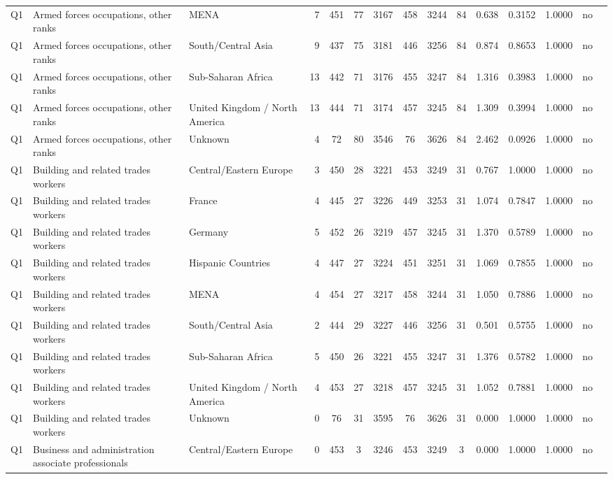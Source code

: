 \begin{longtable}{lllrcccccccccll}
Q1 & Armed forces occupations, other ranks & MENA & 7 & 451 & 77 & 3167 & 458 & 3244 & 84 & 0.638 & 0.3152 & 1.0000 & no \\
Q1 & Armed forces occupations, other ranks & South/Central Asia & 9 & 437 & 75 & 3181 & 446 & 3256 & 84 & 0.874 & 0.8653 & 1.0000 & no \\
Q1 & Armed forces occupations, other ranks & Sub-Saharan Africa & 13 & 442 & 71 & 3176 & 455 & 3247 & 84 & 1.316 & 0.3983 & 1.0000 & no \\
Q1 & Armed forces occupations, other ranks & United Kingdom / North America & 13 & 444 & 71 & 3174 & 457 & 3245 & 84 & 1.309 & 0.3994 & 1.0000 & no \\
Q1 & Armed forces occupations, other ranks & Unknown & 4 & 72 & 80 & 3546 & 76 & 3626 & 84 & 2.462 & 0.0926 & 1.0000 & no \\
Q1 & Building and related trades workers & Central/Eastern Europe & 3 & 450 & 28 & 3221 & 453 & 3249 & 31 & 0.767 & 1.0000 & 1.0000 & no \\
Q1 & Building and related trades workers & France & 4 & 445 & 27 & 3226 & 449 & 3253 & 31 & 1.074 & 0.7847 & 1.0000 & no \\
Q1 & Building and related trades workers & Germany & 5 & 452 & 26 & 3219 & 457 & 3245 & 31 & 1.370 & 0.5789 & 1.0000 & no \\
Q1 & Building and related trades workers & Hispanic Countries & 4 & 447 & 27 & 3224 & 451 & 3251 & 31 & 1.069 & 0.7855 & 1.0000 & no \\
Q1 & Building and related trades workers & MENA & 4 & 454 & 27 & 3217 & 458 & 3244 & 31 & 1.050 & 0.7886 & 1.0000 & no \\
Q1 & Building and related trades workers & South/Central Asia & 2 & 444 & 29 & 3227 & 446 & 3256 & 31 & 0.501 & 0.5755 & 1.0000 & no \\
Q1 & Building and related trades workers & Sub-Saharan Africa & 5 & 450 & 26 & 3221 & 455 & 3247 & 31 & 1.376 & 0.5782 & 1.0000 & no \\
Q1 & Building and related trades workers & United Kingdom / North America & 4 & 453 & 27 & 3218 & 457 & 3245 & 31 & 1.052 & 0.7881 & 1.0000 & no \\
Q1 & Building and related trades workers & Unknown & 0 & 76 & 31 & 3595 & 76 & 3626 & 31 & 0.000 & 1.0000 & 1.0000 & no \\
Q1 & Business and administration associate professionals & Central/Eastern Europe & 0 & 453 & 3 & 3246 & 453 & 3249 & 3 & 0.000 & 1.0000 & 1.0000 & no \\

\end{longtable}
